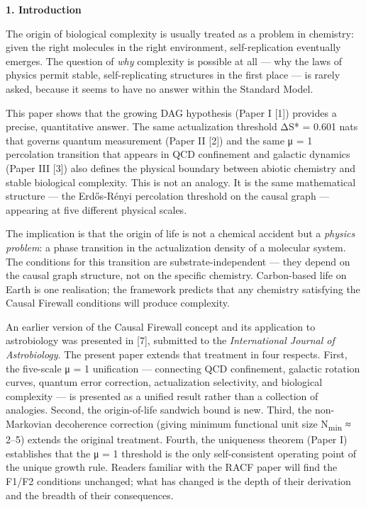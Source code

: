 \documentclass[12pt,a4paper]{article}
\begin{document}
\textbf{1. Introduction}

The origin of biological complexity is usually treated as a problem in
chemistry: given the right molecules in the right environment,
self-replication eventually emerges. The question of \emph{why}
complexity is possible at all --- why the laws of physics permit stable,
self-replicating structures in the first place --- is rarely asked,
because it seems to have no answer within the Standard Model.

This paper shows that the growing DAG hypothesis (Paper I {[}1{]})
provides a precise, quantitative answer. The same actualization
threshold ΔS* = 0.601 nats that governs quantum measurement (Paper II
{[}2{]}) and the same μ = 1 percolation transition that appears in QCD
confinement and galactic dynamics (Paper III {[}3{]}) also defines the
physical boundary between abiotic chemistry and stable biological
complexity. This is not an analogy. It is the same mathematical
structure --- the Erdős-Rényi percolation threshold on the causal graph
--- appearing at five different physical scales.

The implication is that the origin of life is not a chemical accident
but a \emph{physics problem}: a phase transition in the actualization
density of a molecular system. The conditions for this transition are
substrate-independent --- they depend on the causal graph structure, not
on the specific chemistry. Carbon-based life on Earth is one
realisation; the framework predicts that any chemistry satisfying the
Causal Firewall conditions will produce complexity.

An earlier version of the Causal Firewall concept and its application to
astrobiology was presented in {[}7{]}, submitted to the
\emph{International Journal of Astrobiology}. The present paper extends
that treatment in four respects. First, the five-scale μ = 1 unification
--- connecting QCD confinement, galactic rotation curves, quantum error
correction, actualization selectivity, and biological complexity --- is
presented as a unified result rather than a collection of analogies.
Second, the origin-of-life sandwich bound is new. Third, the
non-Markovian decoherence correction (giving minimum functional unit
size N\textsubscript{min} ≈ 2--5) extends the original treatment.
Fourth, the uniqueness theorem (Paper I) establishes that the μ = 1
threshold is the only self-consistent operating point of the unique
growth rule. Readers familiar with the RACF paper will find the F1/F2
conditions unchanged; what has changed is the depth of their derivation
and the breadth of their consequences.
\end{document}
